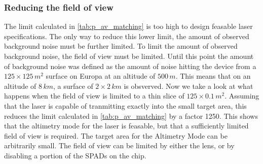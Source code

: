 \subsubsection{Reducing the field of view}
The limit calculated in \cref{tab:p_av_matching} is too high to design feasable laser specifications. The only way to reduce this lower limit, the amount of observed background noise must be further limited. To limit the amount of observed background noise, the field of view must be limited. Until this point the amount of background noise was defined as the amount of noise hitting the device from a $125\times125\,m^2$ surface on Europa at an altitude of $500\,m$. This means that on an altitude of $8\,km$, a surface of $2\times2\,km$ is obsverved. Now we take a look at what happens when the field of view is limited to a thin slice of $125\times0.1\,m^2$. Assuming that the laser is capable of tranmitting exactly into the small target area, this reduces the limit calculated in \cref{tab:p_av_matching} by a factor 1250. This shows that the altimetry mode for the laser is feasable, but that a sufficiently limited field of view is required. The target area for the Altimetry Mode can be arbitrarily small. The field of view can be limited by either the lens, or by disabling a portion of the SPADs on the chip.